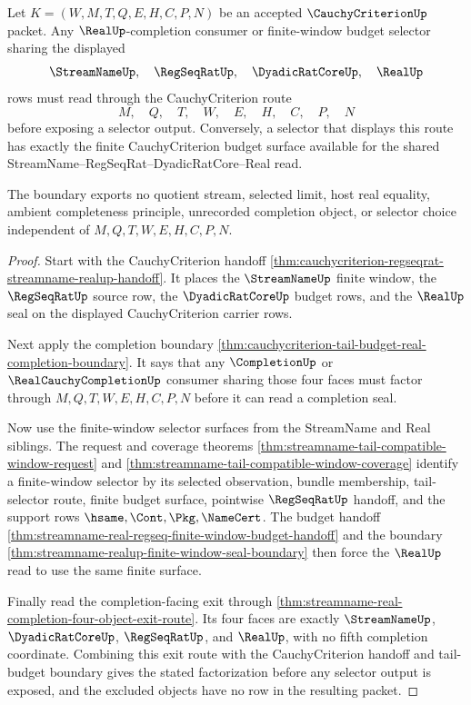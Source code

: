 \begin{theorem}
\label{thm:cauchycriterion-streamname-real-budget-selector-boundary}
Let $K=(W,M,T,Q,E,H,C,P,N)$ be an accepted $\CauchyCriterionUp$ packet. Any
$\RealUp$-completion consumer or finite-window budget selector sharing the
displayed
$$
\StreamNameUp,\quad \RegSeqRatUp,\quad \DyadicRatCoreUp,\quad \RealUp
$$
rows must read through the CauchyCriterion route
$$
M,\quad Q,\quad T,\quad W,\quad E,\quad H,\quad C,\quad P,\quad N
$$
before exposing a selector output. Conversely, a selector that displays this
route has exactly the finite CauchyCriterion budget surface available for the
shared StreamName--RegSeqRat--DyadicRatCore--Real read.

The boundary exports no quotient stream, selected limit, host real equality,
ambient completeness principle, unrecorded completion object, or selector
choice independent of $M,Q,T,W,E,H,C,P,N$.
\end{theorem}
\begin{proof}
Start with the CauchyCriterion handoff
\autoref{thm:cauchycriterion-regseqrat-streamname-realup-handoff}. It places
the $\StreamNameUp$ finite window, the $\RegSeqRatUp$ source row, the
$\DyadicRatCoreUp$ budget rows, and the $\RealUp$ seal on the displayed
CauchyCriterion carrier rows.

Next apply the completion boundary
\autoref{thm:cauchycriterion-tail-budget-real-completion-boundary}. It says
that any $\CompletionUp$ or $\RealCauchyCompletionUp$ consumer sharing those
four faces must factor through $M,Q,T,W,E,H,C,P,N$ before it can read a
completion seal.

Now use the finite-window selector surfaces from the StreamName and Real
siblings. The request and coverage theorems
\autoref{thm:streamname-tail-compatible-window-request} and
\autoref{thm:streamname-tail-compatible-window-coverage} identify a
finite-window selector by its selected observation, bundle membership,
tail-selector route, finite budget surface, pointwise $\RegSeqRatUp$ handoff,
and the support rows $\hsame,\Cont,\Pkg,\NameCert$. The budget handoff
\autoref{thm:streamname-real-regseq-finite-window-budget-handoff} and the
boundary \autoref{thm:streamname-realup-finite-window-seal-boundary} then
force the $\RealUp$ read to use the same finite surface.

Finally read the completion-facing exit through
\autoref{thm:streamname-real-completion-four-object-exit-route}. Its four
faces are exactly $\StreamNameUp$, $\DyadicRatCoreUp$, $\RegSeqRatUp$, and
$\RealUp$, with no fifth completion coordinate. Combining this exit route with
the CauchyCriterion handoff and tail-budget boundary gives the stated
factorization before any selector output is exposed, and the excluded objects
have no row in the resulting packet.
\end{proof}

